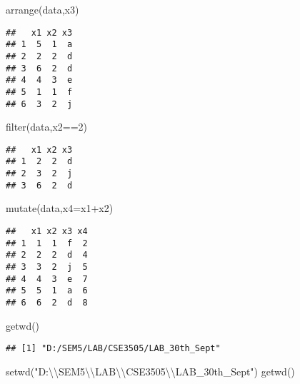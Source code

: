 \documentclass[
]{article}
\newenvironment{Shaded}{\begin{snugshade}}{\end{snugshade}}
\newcommand{\AttributeTok}[1]{\textcolor[rgb]{0.77,0.63,0.00}{#1}}
\newcommand{\DecValTok}[1]{\textcolor[rgb]{0.00,0.00,0.81}{#1}}
\newcommand{\FunctionTok}[1]{\textcolor[rgb]{0.00,0.00,0.00}{#1}}
\newcommand{\NormalTok}[1]{#1}
\newcommand{\SpecialCharTok}[1]{\textcolor[rgb]{0.00,0.00,0.00}{#1}}
\newcommand{\StringTok}[1]{\textcolor[rgb]{0.31,0.60,0.02}{#1}}
\begin{document}
\begin{Shaded}
\begin{Highlighting}[]
\FunctionTok{arrange}\NormalTok{(data,x3)}
\end{Highlighting}
\end{Shaded}

\begin{verbatim}
##   x1 x2 x3
## 1  5  1  a
## 2  2  2  d
## 3  6  2  d
## 4  4  3  e
## 5  1  1  f
## 6  3  2  j
\end{verbatim}

\begin{Shaded}
\begin{Highlighting}[]
\FunctionTok{filter}\NormalTok{(data,x2}\SpecialCharTok{==}\DecValTok{2}\NormalTok{)}
\end{Highlighting}
\end{Shaded}

\begin{verbatim}
##   x1 x2 x3
## 1  2  2  d
## 2  3  2  j
## 3  6  2  d
\end{verbatim}

\begin{Shaded}
\begin{Highlighting}[]
\FunctionTok{mutate}\NormalTok{(data,}\AttributeTok{x4=}\NormalTok{x1}\SpecialCharTok{+}\NormalTok{x2)}
\end{Highlighting}
\end{Shaded}

\begin{verbatim}
##   x1 x2 x3 x4
## 1  1  1  f  2
## 2  2  2  d  4
## 3  3  2  j  5
## 4  4  3  e  7
## 5  5  1  a  6
## 6  6  2  d  8
\end{verbatim}

\begin{Shaded}
\begin{Highlighting}[]
\FunctionTok{getwd}\NormalTok{()}
\end{Highlighting}
\end{Shaded}

\begin{verbatim}
## [1] "D:/SEM5/LAB/CSE3505/LAB_30th_Sept"
\end{verbatim}

\begin{Shaded}
\begin{Highlighting}[]
\FunctionTok{setwd}\NormalTok{(}\StringTok{"D:}\SpecialCharTok{\textbackslash{}\textbackslash{}}\StringTok{SEM5}\SpecialCharTok{\textbackslash{}\textbackslash{}}\StringTok{LAB}\SpecialCharTok{\textbackslash{}\textbackslash{}}\StringTok{CSE3505}\SpecialCharTok{\textbackslash{}\textbackslash{}}\StringTok{LAB\_30th\_Sept"}\NormalTok{)}
\FunctionTok{getwd}\NormalTok{()}
\end{Highlighting}
\end{Shaded}
\end{document}
